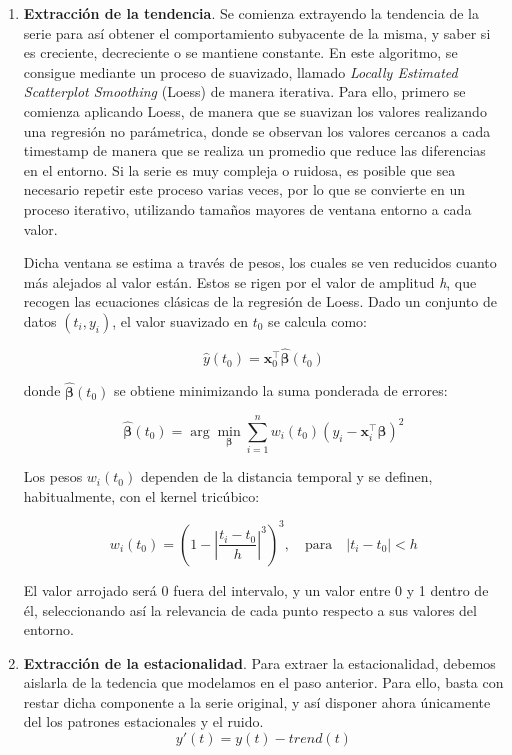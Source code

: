 \begin{enumerate}
    \item \textbf{Extracción de la tendencia}. Se comienza extrayendo la tendencia de la serie para así obtener el comportamiento subyacente de la misma, y saber si es creciente, decreciente o se mantiene constante. En este algoritmo, se consigue mediante un proceso de suavizado, llamado \textit{Locally Estimated Scatterplot Smoothing} (Loess) de manera iterativa. Para ello, primero se comienza aplicando Loess, de manera que se suavizan los valores realizando una regresión no parámetrica, donde se observan los valores cercanos a cada timestamp de manera que se realiza un promedio que reduce las diferencias en el entorno. Si la serie es muy compleja o ruidosa, es posible que sea necesario repetir este proceso varias veces, por lo que se convierte en un proceso iterativo, utilizando tamaños mayores de ventana entorno a cada valor.

    Dicha ventana se estima a través de pesos, los cuales se ven reducidos cuanto más alejados al valor están. Estos se rigen por el valor de amplitud \textit{h}, que recogen las ecuaciones clásicas de la regresión de Loess. Dado un conjunto de datos \((t_i, y_i)\), el valor suavizado en \( t_0 \) se calcula como:

    \[
        \hat{y}(t_0) = \mathbf{x}_0^\top \hat{\boldsymbol{\beta}}(t_0)
    \]

    donde \(\hat{\boldsymbol{\beta}}(t_0)\) se obtiene minimizando la suma ponderada de errores:

    \[
        \hat{\boldsymbol{\beta}}(t_0) = \arg\min_{\boldsymbol{\beta}} \sum_{i=1}^n w_i(t_0) \left(y_i - \mathbf{x}_i^\top \boldsymbol{\beta}\right)^2
    \]

    Los pesos \( w_i(t_0) \) dependen de la distancia temporal y se definen, habitualmente, con el kernel tricúbico:

    \[
        w_i(t_0) = \left(1 - \left|\frac{t_i - t_0}{h}\right|^3\right)^3, \quad \text{para} \quad |t_i - t_0| < h
    \]

    El valor arrojado será 0 fuera del intervalo, y un valor entre 0 y 1 dentro de él, seleccionando así la relevancia de cada punto respecto a sus valores del entorno.

    \item  \textbf{Extracción de la estacionalidad}. Para extraer la estacionalidad, debemos aislarla de la tedencia que modelamos en el paso anterior. Para ello, basta con restar dicha componente a la serie original, y así disponer ahora únicamente del los patrones estacionales y el ruido.
    $$y'(t) = y(t) - trend(t)$$


\end{enumerate}
